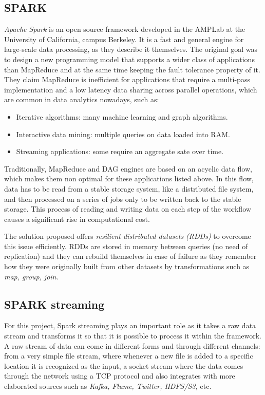 \documentclass[10pt, conference, compsocconf]{IEEEtran}
\begin{document}
\subsection{SPARK}

\textit{Apache Spark} is an open source framework developed in the AMPLab at the University of California, campus Berkeley\cite{SparkResearch}. It is a fast and general engine for large-scale data processing, as they describe it themselves. The original goal was to design a new programming model that supports a wider class of applications than MapReduce and at the same time keeping the fault tolerance property of it. They claim MapReduce is inefficient for applications that require a multi-pass implementation and a low latency data sharing across parallel operations, which are common in data analytics nowadays, such as: 

\begin{itemize}
 \item Iterative algorithms: many machine learning and graph algorithms.
 \item Interactive data mining: multiple queries on data loaded into RAM.
 \item Streaming applications: some require an aggregate sate over time.
\end{itemize}

Traditionally, MapReduce and DAG engines are based on an acyclic data flow, which makes them non optimal for these applications listed above. In this flow, data has to be read from a stable storage system, like a distributed file system, and then processed on a series of jobs only to be written back to the stable storage. This process of reading and writing data on each step of the workflow causes a significant rise in computational cost.

The solution proposed offers \textit{resilient distributed datasets (RDDs)} to overcome this issue efficiently. RDDs are stored in memory between queries (no need of replication) and they can rebuild themselves in case of failure as they remember how they were originally built from other datasets by transformations such as \textit{map, group, join}.

\subsection{SPARK streaming}

For this project, Spark streaming plays an important role as it takes a raw data stream and transforms it so that it is possible to process it within the framework. A raw stream of data can come in different forms and through different channels: from a very simple file stream, where whenever a new file is added to a specific location it is recognized as the input, a socket stream where the data comes through the network using a TCP protocol and also integrates with more elaborated sources such as \textit{Kafka, Flume, Twitter, HDFS/S3,} etc.
\end{document}
